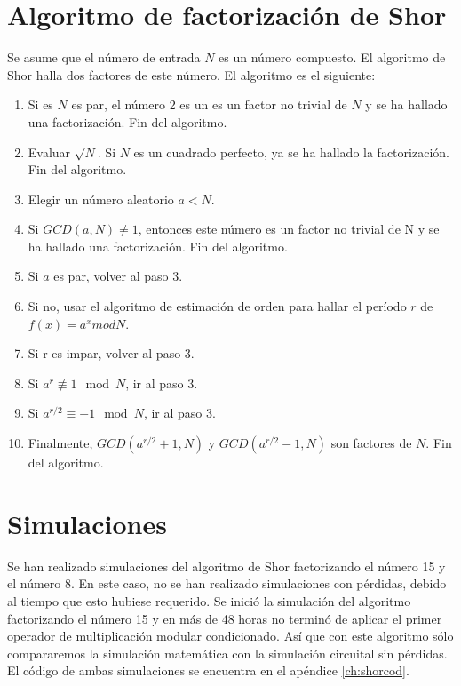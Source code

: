 \section{Algoritmo de factorización de Shor}

Se asume que el número de entrada $N$ es un número compuesto. El algoritmo de Shor halla dos factores de este número. El algoritmo es el siguiente:

\begin{enumerate}
    \item Si es $N$ es par, el número 2 es un es un factor no trivial de $N$ y se ha hallado una factorización. Fin del algoritmo.
    \item Evaluar $\sqrt{N}$. Si $N$ es un cuadrado perfecto, ya se ha hallado la factorización. Fin del algoritmo.
    \item Elegir un número aleatorio $a < N$.
    \item Si $GCD(a,N) \neq 1$, entonces este número es un factor no trivial de N y se ha hallado una factorización. Fin del algoritmo.
    \item Si $a$ es par, volver al paso 3.
    \item Si no, usar el algoritmo de estimación de orden para hallar el período $r$ de $f(x) = a^x mod N$.
    \item Si r es impar, volver al paso 3.
    \item Si $a^{r} \not\equiv 1 \mod N$, ir al paso 3.
    \item Si $a^{r/2} \equiv -1 \mod N$, ir al paso 3.
    \item Finalmente, $GCD(a^{r/2} + 1, N)$ y $GCD(a^{r/2} - 1, N)$ son factores de $N$. Fin del algoritmo.
\end{enumerate}

\section{Simulaciones}

Se han realizado simulaciones del algoritmo de Shor factorizando el número 15 y el número 8. En este caso, no se han realizado simulaciones con pérdidas, debido al tiempo que esto hubiese requerido. Se inició la simulación del algoritmo factorizando el número 15 y en más de 48 horas no terminó de aplicar el primer operador de multiplicación modular condicionado. Así que con este algoritmo sólo compararemos la simulación matemática con la simulación circuital sin pérdidas. El código de ambas simulaciones se encuentra en el apéndice \ref{ch:shorcod}.

